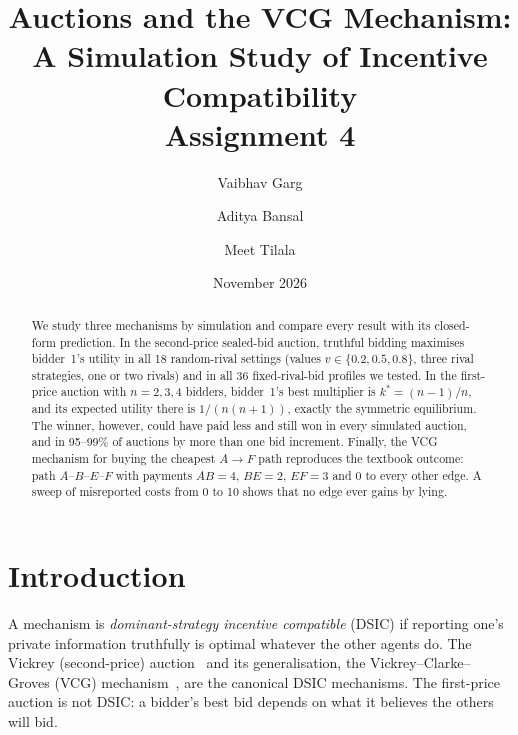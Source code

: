 \documentclass[11pt,a4paper]{article}
\title{\textbf{Auctions and the VCG Mechanism:\\A Simulation Study of Incentive Compatibility}\\[0.4em]
\large Assignment 4}
\author{Vaibhav Garg \and Aditya Bansal \and Meet Tilala}
\date{November 2026}
\begin{document}
\maketitle

\begin{abstract}
We study three mechanisms by simulation and compare every result with its closed-form prediction.
In the second-price sealed-bid auction, truthful bidding maximises bidder~1's utility in all
18 random-rival settings (values $v\in\{0.2,0.5,0.8\}$, three rival strategies, one or two rivals)
and in all 36 fixed-rival-bid profiles we tested.
In the first-price auction with $n=2,3,4$ bidders, bidder~1's best multiplier is
$k^\ast=(n-1)/n$, and its expected utility there is $1/(n(n+1))$, exactly the symmetric
equilibrium. The winner, however, could have paid less and still won in every simulated auction,
and in 95--99\% of auctions by more than one bid increment.
Finally, the VCG mechanism for buying the cheapest $A\to F$ path reproduces the textbook outcome:
path $A$--$B$--$E$--$F$ with payments $AB=4$, $BE=2$, $EF=3$ and $0$ to every other edge.
A sweep of misreported costs from 0 to 10 shows that no edge ever gains by lying.
\end{abstract}

\section{Introduction}
A mechanism is \emph{dominant-strategy incentive compatible} (DSIC) if reporting one's
private information truthfully is optimal whatever the other agents do. The Vickrey
(second-price) auction~\cite{vickrey1961} and its generalisation, the Vickrey--Clarke--Groves
(VCG) mechanism~\cite{clarke1971,groves1973}, are the canonical DSIC mechanisms. The first-price
auction is not DSIC: a bidder's best bid depends on what it believes the others will bid.
\end{document}
